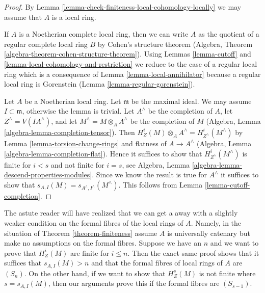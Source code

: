 \begin{proof}
By Lemma \ref{lemma-check-finiteness-local-cohomology-locally}
we may assume that $A$ is a local ring.

\medskip\noindent
If $A$ is a Noetherian complete local ring, then we can write $A$
as the quotient of a regular complete local ring $B$ by
Cohen's structure theorem
(Algebra, Theorem \ref{algebra-theorem-cohen-structure-theorem}).
Using Lemmas \ref{lemma-cutoff} and
\ref{lemma-local-cohomology-and-restriction}
we reduce to the case
of a regular local ring which is a consequence of
Lemma \ref{lemma-local-annihilator}
because a regular local ring is Gorenstein
(Lemma \ref{lemma-regular-gorenstein}).

\medskip\noindent
Let $A$ be a Noetherian local ring. Let $\mathfrak m$ be the maximal ideal.
We may assume $I \subset \mathfrak m$, otherwise the lemma is trivial.
Let $A^\wedge$ be the completion of $A$, let $Z^\wedge = V(IA^\wedge)$, and
let $M^\wedge = M \otimes_A A^\wedge$ be the completion of $M$
(Algebra, Lemma \ref{algebra-lemma-completion-tensor}).
Then $H^i_Z(M) \otimes_A A^\wedge = H^i_{Z^\wedge}(M^\wedge)$ by
Lemma \ref{lemma-torsion-change-rings} and flatness of $A \to A^\wedge$
(Algebra, Lemma \ref{algebra-lemma-completion-flat}).
Hence it suffices to show that $H^i_{Z^\wedge}(M^\wedge)$ is
finite for $i < s$ and not finite for $i = s$, see
Algebra, Lemma \ref{algebra-lemma-descend-properties-modules}.
Since we know the result is true for $A^\wedge$ it suffices
to show that $s_{A, I}(M) = s_{A^\wedge, I^\wedge}(M^\wedge)$.
This follows from Lemma \ref{lemma-cutoff-completion}.
\end{proof}

\begin{remark}
\label{remark-astute-reader}
The astute reader will have realized that we can get a away with a
slightly weaker condition on the formal fibres of the local rings
of $A$. Namely, in the situation of Theorem \ref{theorem-finiteness}
assume $A$ is universally catenary but make no assumptions on
the formal fibres. Suppose we have an $n$ and we want to prove that
$H^i_Z(M)$ are finite for $i \leq n$. Then the exact same proof
shows that it suffices that $s_{A, I}(M) > n$ and that
the formal fibres of local rings of $A$ are $(S_n)$.
On the other hand, if we want to show that $H^s_Z(M)$
is not finite where $s = s_{A, I}(M)$, then our arguments prove
this if the formal fibres are $(S_{s - 1})$.
\end{remark}







